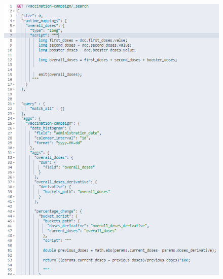 \documentclass{article}[IEEEtran]
\begin{document}
\begin{figure}[H]
\begin{center}
\begin{minipage}[b]{0.4\textwidth}
    \includegraphics[width=\textwidth, frame]{Query_6.PNG}
    \subcaption{}
  \end{minipage}
  \hfill
  \begin{minipage}[b]{0.4\textwidth}

\end{minipage}
\end{center}
\end{figure}
\end{document}
